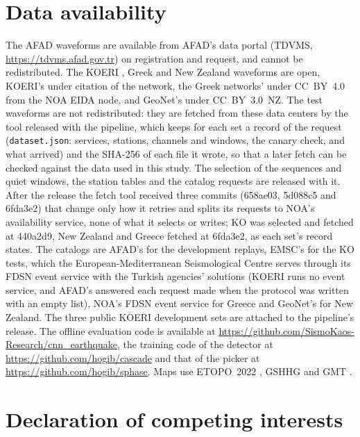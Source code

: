 \documentclass[a4paper,fleqn]{cas-sc}
\begin{document}
\section*{Data availability}

The AFAD waveforms are available from AFAD's data portal (TDVMS,
\url{https://tdvms.afad.gov.tr}) on registration and request, and cannot be
redistributed. The KOERI \citep{koeri1971}, Greek \citep{hl1975,ht1981,ha2008,hp2000,hc2006}
and New Zealand \citep{geonet2021waveforms} waveforms are open, KOERI's under citation
of the network, the Greek networks' under CC~BY~4.0 from the NOA EIDA node, and
GeoNet's under CC~BY~3.0~NZ. The test waveforms are not redistributed: they are
fetched from these data centers by the tool released with the pipeline, which
keeps for each set a record of the request (\texttt{dataset.json}: services,
stations, channels and windows, the canary check, and what arrived) and the SHA-256
of each file it wrote, so that a later fetch can be checked against the data used in
this study. The selection of the sequences and quiet windows, the station tables and the
catalog requests are released with it. After the release the fetch tool received three
commits (658ae03, 5d088c5 and 6fda3e2) that change only how it retries and splits its
requests to NOA's availability service, none of what it selects or writes; KO was
selected and fetched at 440a2d9, New Zealand and Greece fetched at 6fda3e2, as each
set's record states. The catalogs are AFAD's for the development replays, EMSC's
\citep{emsc2026catalogue} for the KO tests, which the European-Mediterranean
Seismological Centre serves through its FDSN event service with the Turkish agencies'
solutions (KOERI runs no event service, and AFAD's answered each request made when
the protocol was written with an empty list), NOA's FDSN event service for Greece
and GeoNet's \citep{geonet1970catalogue} for New Zealand. The three public KOERI
development sets are attached to the pipeline's release. The offline evaluation code
is available at \url{https://github.com/SismoKaos-Research/cnn_earthquake}, the
training code of the detector at \url{https://github.com/hogib/cascade} and that of
the picker at \url{https://github.com/hogib/sphase}. Maps use ETOPO~2022
\citep{etopo2022}, GSHHG \citep{wessel1996} and GMT \citep{wessel2019}.

\section*{Declaration of competing interests}
\end{document}
